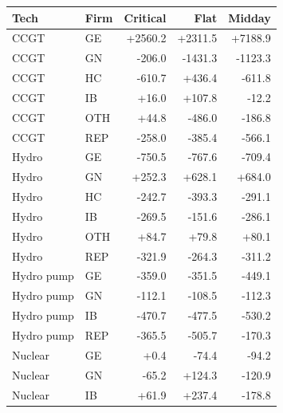 \begin{tabular}{l l r r r}
\toprule
Tech & Firm & Critical & Flat & Midday \\
\midrule
CCGT & GE & +2560.2 & +2311.5 & +7188.9 \\
CCGT & GN & -206.0 & -1431.3 & -1123.3 \\
CCGT & HC & -610.7 & +436.4 & -611.8 \\
CCGT & IB & +16.0 & +107.8 & -12.2 \\
CCGT & OTH & +44.8 & -486.0 & -186.8 \\
CCGT & REP & -258.0 & -385.4 & -566.1 \\
Hydro & GE & -750.5 & -767.6 & -709.4 \\
Hydro & GN & +252.3 & +628.1 & +684.0 \\
Hydro & HC & -242.7 & -393.3 & -291.1 \\
Hydro & IB & -269.5 & -151.6 & -286.1 \\
Hydro & OTH & +84.7 & +79.8 & +80.1 \\
Hydro & REP & -321.9 & -264.3 & -311.2 \\
Hydro pump & GE & -359.0 & -351.5 & -449.1 \\
Hydro pump & GN & -112.1 & -108.5 & -112.3 \\
Hydro pump & IB & -470.7 & -477.5 & -530.2 \\
Hydro pump & REP & -365.5 & -505.7 & -170.3 \\
Nuclear & GE & +0.4 & -74.4 & -94.2 \\
Nuclear & GN & -65.2 & +124.3 & -120.9 \\
Nuclear & IB & +61.9 & +237.4 & -178.8 \\
\bottomrule
\end{tabular}